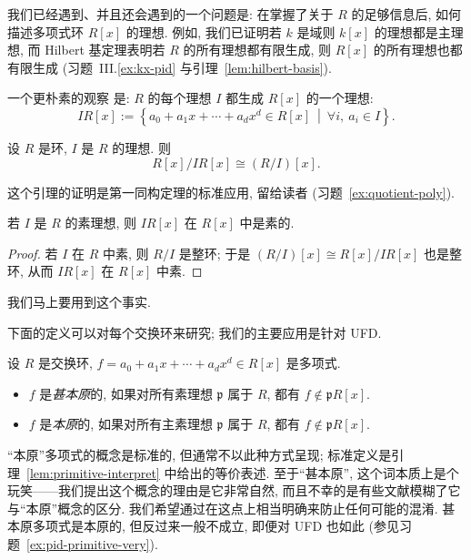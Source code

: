我们已经遇到、并且还会遇到的一个问题是: 在掌握了关于 $R$ 的足够信息后, 如何描述多项式环 $R[x]$ 的理想. 例如, 我们已证明若 $k$ 是域则 $k[x]$ 的理想都是主理想, 而 Hilbert 基定理表明若 $R$ 的所有理想都有限生成, 则 $R[x]$ 的所有理想也都有限生成 (习题~III.\ref{ex:kx-pid} 与引理~\ref{lem:hilbert-basis}).

\noindent 一个更朴素的观察 是: $R$ 的每个理想 $I$ 都生成 $R[x]$ 的一个理想:
\[
IR[x] := \left\{a_0+a_1x+\cdots+a_dx^d\in R[x]\ \middle|\ \forall i,\ a_i\in I\right\}.
\]

\begin{lemma}\label{lem:quotient-poly}
设 $R$ 是环, $I$ 是 $R$ 的理想. 则
\[
R[x]/IR[x] \cong (R/I)[x].
\]
\end{lemma}

\noindent 这个引理的证明是第一同构定理的标准应用, 留给读者 (习题~\ref{ex:quotient-poly}).

\begin{corollary}\label{cor:prime-ideal-poly}
若 $I$ 是 $R$ 的素理想, 则 $IR[x]$ 在 $R[x]$ 中是素的.
\end{corollary}

\begin{proof}
若 $I$ 在 $R$ 中素, 则 $R/I$ 是整环; 于是 $(R/I)[x]\cong R[x]/IR[x]$ 也是整环, 从而 $IR[x]$ 在 $R[x]$ 中素.
\end{proof}

\noindent 我们马上要用到这个事实.

\noindent 下面的定义可以对每个交换环来研究; 我们的主要应用是针对 UFD.

\begin{definition}\label{def:primitive}
设 $R$ 是交换环, $f=a_0+a_1x+\cdots+a_dx^d\in R[x]$ 是多项式.
\begin{itemize}
\item $f$ 是\emph{甚本原}的, 如果对所有素理想 $\mathfrak{p}$ 属于 $R$, 都有 $f\notin \mathfrak{p}R[x]$.
\item $f$ 是\emph{本原}的, 如果对所有主素理想 $\mathfrak{p}$ 属于 $R$, 都有 $f\notin \mathfrak{p}R[x]$.
\end{itemize}
\end{definition}

\noindent ``本原''多项式的概念是标准的, 但通常不以此种方式呈现; 标准定义是引理~\ref{lem:primitive-interpret} 中给出的等价表述. 至于``甚本原'', 这个词本质上是个玩笑——我们提出这个概念的理由是它非常自然, 而且不幸的是有些文献模糊了它与``本原''概念的区分. 我们希望通过在这点上相当明确来防止任何可能的混淆. 甚本原多项式是本原的, 但反过来一般不成立, 即便对 UFD 也如此 (参见习题~\ref{ex:pid-primitive-very}).

